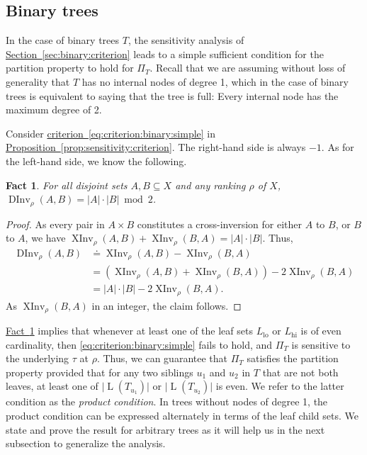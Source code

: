 \documentclass[11pt]{article}
\numberwithin{equation}{section}
\newtheorem{fact}[theorem]{Fact}
\theoremstyle{definition}
\theoremstyle{plain}
\newcommand{\expref}[2]{\hyperref[#2]{#1~\ref{#2}}}
\newcommand{\A}{A}
\DeclareMathOperator{\leafset}{L}
\newcommand{\ranking}{\rho}
\newcommand{\transposition}{\tau}
\DeclareMathOperator{\XInv}{XInv}
\DeclareMathOperator{\DInv}{DInv}
\newcommand{\lo}{\mathrm{lo}}
\newcommand{\hi}{\mathrm{hi}}
\begin{document}
\subsection{Binary trees}
\label{sec:connectivity:binary}

In the case of binary trees $T$, the sensitivity analysis of \expref{Section}{sec:binary:criterion} leads to a simple sufficient condition for the partition property to hold for $\Pi_T$.
Recall that we are assuming without loss of generality that $T$ has no internal nodes of degree 1, which in the case of binary trees is equivalent to saying that the tree is full: Every internal node has the maximum degree of 2. 

Consider \expref{criterion}{eq:criterion:binary:simple} in \expref{Proposition}{prop:sensitivity:criterion}. The right-hand side is always $-1$. As for the left-hand side, we know the following.
\begin{fact}\label{fact:DInv:parity}
For all disjoint sets $A, B \subseteq X$ and any ranking $\ranking$ of $X$, $\DInv_\ranking(A,B) = |A| \cdot |B| \bmod 2$. 
\end{fact}
\begin{proof}
As every pair in $\A \times B$ constitutes a cross-inversion for either $A$ to $B$, or $B$ to $A$, we have 
$\XInv_\ranking(A,B) + \XInv_\ranking(B,A) = |A| \cdot |B|$.
%
Thus,
\begin{align}
\DInv_\ranking(A,B) 
& \doteq  \XInv_\ranking(A,B) - \XInv_\ranking(B,A) \nonumber \\
& = (\XInv_\ranking(A,B) + \XInv_\ranking(B,A)) - 2 \XInv_\ranking(B,A) \nonumber \\
& = |A| \cdot |B| - 2 \XInv_\ranking(B,A). \label{eq:DInv:as:XInv}
\end{align}
As $\XInv_\ranking(B,A)$ in an integer, the claim follows.
\end{proof}
\expref{Fact}{fact:DInv:parity} implies that whenever at least one of the leaf sets $L_\lo$ or $L_\hi$ is of even cardinality, then \eqref{eq:criterion:binary:simple} fails to hold, and $\Pi_T$ is sensitive to the underlying $\transposition$ at $\ranking$. Thus, we can guarantee that $\Pi_T$ satisfies the partition property provided that for any two siblings $u_1$ and $u_2$ in $T$ that are not both leaves, at least one of $\lvert\leafset(T_{u_1})\rvert$ or $\lvert\leafset(T_{u_2})\rvert$ is even. We refer to the latter condition as the \emph{product condition}. In trees without nodes of degree 1, the product condition can be expressed alternately in terms of the leaf child sets. We state and prove the result for arbitrary trees as it will help us in the next subsection to generalize the analysis.
\end{document}
